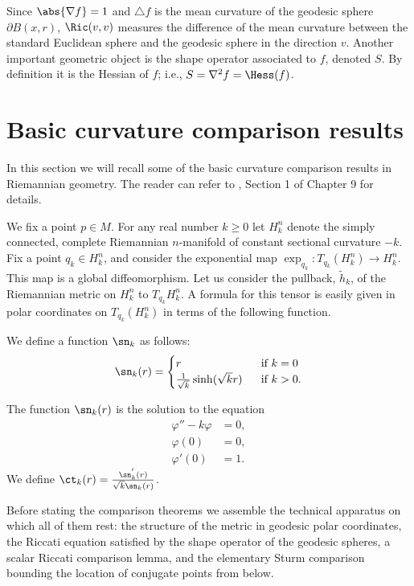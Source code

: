 \medskip

Since $\abs{\nabla f} = 1$ and $\triangle f$ is the mean curvature
of the geodesic sphere $\partial B(x,r)$, $\Ric(v,v)$ measures
the difference of the mean curvature between the standard Euclidean
sphere and the geodesic sphere in the direction $v$. Another
important geometric object  is the shape operator associated to $f$,
denoted $S$. By definition it is the Hessian of $f$; i.e.,
$S=\nabla^2f=\Hess(f)$.

\section{Basic curvature comparison results}
In this section we will recall some of the basic curvature
comparison results in Riemannian geometry. The reader can refer to
\cite{Petersen}, Section 1 of Chapter 9 for details.

\smallskip

We fix a point $p\in M$. For any real number $k\ge 0$ let $H^n_k$ denote the
simply connected, complete Riemannian $n$-manifold of constant sectional
curvature $-k$. Fix a point $q_k\in H^n_k$, and consider the exponential map
$\exp_{q_k}\colon T_{q_k}(H^n_k)\to H^n_k$. This map is a global
diffeomorphism. Let us consider the pullback, $\tilde h_k$, of the Riemannian
metric on $H^n_k$ to $T_{q_k}H^n_k$. A formula for this tensor is easily given
in polar coordinates on $T_{q_k}(H^n_k)$ in terms of the following function.

\begin{definition}
\label{def:sinh-comparison-function}
\leanok
We define a function $\sn_k$ as follows:$$\sn_k(r)=\begin{cases}
r \ \  & \text{if }k=0 \\
\frac{1}{\sqrt{k}}\sinh(\sqrt{k}r) \ \ & \text{if } k>0.
\end{cases}$$
\end{definition}

The function $\sn_{k}(r)$ is the solution to the equation
\begin{align*}
 \varphi'' - k\varphi &= 0,\\
\varphi(0) &= 0,\\
\varphi'(0) &= 1.
\end{align*}
We define
 $\ct_{k}(r) = \frac{\sn_{k}^{'}(r)}{\sqrt{k}\sn_{k}(r)}$.

Before stating the comparison theorems we assemble the technical
apparatus on which all of them rest: the structure of the metric in
geodesic polar coordinates, the Riccati equation satisfied by the
shape operator of the geodesic spheres, a scalar Riccati comparison
lemma, and the elementary Sturm comparison bounding the location of
conjugate points from below.

